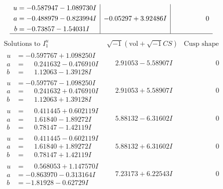 \documentclass[1p]{elsarticle_modified}
\theoremstyle{definition}
\newcommand{\I}{\sqrt{-1}}
\begin{document}
$$\begin{array}{c|c|c}
\begin{aligned}
u &= -0.587947 - 1.089730 I \\
a &= -0.488979 - 0.823994 I \\
b &= -0.73857 - 1.54031 I\end{aligned}
 & -0.05297 + 3.92486 I & \phantom{-0.000000 } 0\\
 \hline 
 \end{array}$$\newpage$$\begin{array}{c|c|c}  
\text{Solutions to }I^u_{1}& \I (\text{vol} + \sqrt{-1}CS) & \text{Cusp shape}\\
 \hline 
\begin{aligned}
u &= -0.597767 + 1.098250 I \\
a &= \phantom{-}0.241632 - 0.476910 I \\
b &= \phantom{-}1.12063 - 1.39128 I\end{aligned}
 & \phantom{-}2.91053 - 5.58907 I & \phantom{-0.000000 } 0 \\ \hline\begin{aligned}
u &= -0.597767 - 1.098250 I \\
a &= \phantom{-}0.241632 + 0.476910 I \\
b &= \phantom{-}1.12063 + 1.39128 I\end{aligned}
 & \phantom{-}2.91053 + 5.58907 I & \phantom{-0.000000 } 0 \\ \hline\begin{aligned}
u &= \phantom{-}0.411445 + 0.602119 I \\
a &= \phantom{-}1.61840 - 1.89272 I \\
b &= \phantom{-}0.78147 - 1.42119 I\end{aligned}
 & \phantom{-}5.88132 - 6.31602 I & \phantom{-0.000000 } 0 \\ \hline\begin{aligned}
u &= \phantom{-}0.411445 - 0.602119 I \\
a &= \phantom{-}1.61840 + 1.89272 I \\
b &= \phantom{-}0.78147 + 1.42119 I\end{aligned}
 & \phantom{-}5.88132 + 6.31602 I & \phantom{-0.000000 } 0 \\ \hline\begin{aligned}
u &= \phantom{-}0.568053 + 1.147570 I \\
a &= -0.863970 - 0.313164 I \\
b &= -1.81928 - 0.62729 I\end{aligned}
 & \phantom{-}7.23173 + 6.22543 I & \phantom{-0.000000 } 0 \\ \hline\begin{aligned}

\end{aligned}
\end{array}$$
\end{document}
